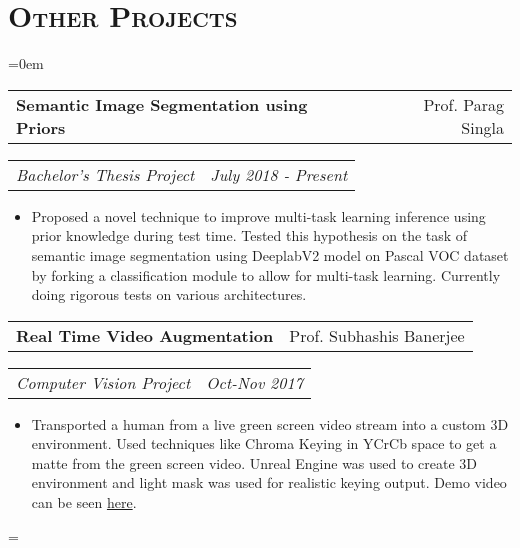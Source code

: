\documentclass{article}
\makeatletter
\newenvironment{longversion}{}{} %
\newenvironment{absolutelynopagebreak}
  {\par\nobreak\vfil\penalty0\vfilneg
   \vtop\bgroup}
  {\par\xdef\tpd{\the\prevdepth}\egroup
   \prevdepth=\tpd}
\newcommand{\headerrow}[2]
{\begin{tabular*}{\linewidth}{l@{\extracolsep{\fill}}r}
	#1 &
	#2 \\
\end{tabular*}}
\newcommand{\tmpsection}[1]{}
\let\tmpsection=\section
\renewcommand{\section}[1]{\tmpsection*{\textsc{#1}}}
\makeatother
\begin{document}
\begin{absolutelynopagebreak}
\begin{longversion}
\section{Other Projects}
\begin{list} {}{\leftmargin=0em}
\setlength{\leftmargin}{0pt}

\item[]
\headerrow {\textbf{Semantic Image Segmentation using Priors}}{Prof. Parag Singla}
\headerrow {\emph{Bachelor's Thesis Project}}{\emph{July 2018 - Present}}
\begin{itemize} \item[] 
Proposed a novel technique to improve multi-task learning inference using prior knowledge during test time. Tested this hypothesis on the task of semantic image segmentation using DeeplabV2 model on Pascal VOC dataset by forking a classification module to allow for multi-task learning. Currently doing rigorous tests on various architectures.
\end{itemize}

\item[]
\headerrow {\textbf{Real Time Video Augmentation}}{Prof. Subhashis Banerjee}
\headerrow {\emph{Computer Vision Project}}{\emph{Oct-Nov 2017}}
\begin{itemize} \item[]
    Transported a human from a live green screen video stream into a custom 3D environment. Used techniques like Chroma Keying in YCrCb space to get a matte from the green screen video. Unreal Engine was used to create 3D environment and light mask was used for realistic keying output. Demo video can be seen \href{https://github.com/ozym4nd145/Vision_Project/blob/master/demo_video/shashank_result.avi?raw=true}{here}.
\end{itemize}


\end{list}
\end{longversion}
\end{absolutelynopagebreak}
\end{document}
